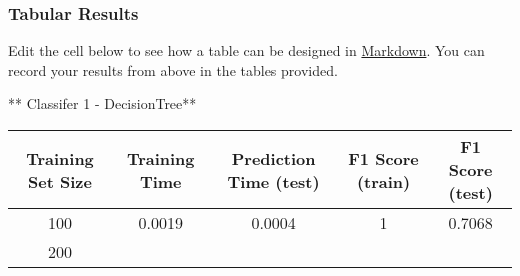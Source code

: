 \documentclass{ctexart}
\begin{document}
    \subsubsection{Tabular Results}\label{tabular-results}

Edit the cell below to see how a table can be designed in
\href{https://github.com/adam-p/markdown-here/wiki/Markdown-Cheatsheet\#tables}{Markdown}.
You can record your results from above in the tables provided.

    ** Classifer 1 - DecisionTree**

\begin{longtable}[]{@{}ccccc@{}}
\toprule
\begin{minipage}[b]{0.16\columnwidth}\centering\strut
Training Set Size\strut
\end{minipage} & \begin{minipage}[b]{0.21\columnwidth}\centering\strut
Training Time\strut
\end{minipage} & \begin{minipage}[b]{0.20\columnwidth}\centering\strut
Prediction Time (test)\strut
\end{minipage} & \begin{minipage}[b]{0.15\columnwidth}\centering\strut
F1 Score (train)\strut
\end{minipage} & \begin{minipage}[b]{0.14\columnwidth}\centering\strut
F1 Score (test)\strut
\end{minipage}\tabularnewline
\midrule
\endhead
\begin{minipage}[t]{0.16\columnwidth}\centering\strut
100\strut
\end{minipage} & \begin{minipage}[t]{0.21\columnwidth}\centering\strut
0.0019\strut
\end{minipage} & \begin{minipage}[t]{0.20\columnwidth}\centering\strut
0.0004\strut
\end{minipage} & \begin{minipage}[t]{0.15\columnwidth}\centering\strut
1\strut
\end{minipage} & \begin{minipage}[t]{0.14\columnwidth}\centering\strut
0.7068\strut
\end{minipage}\tabularnewline
\begin{minipage}[t]{0.16\columnwidth}\centering\strut
200\strut
\end{minipage} & \begin{minipage}[t]{0.21\columnwidth}\centering\strut

\end{minipage}
\end{longtable}
\end{document}
